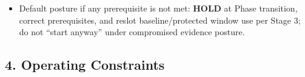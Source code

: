 \documentclass[10pt]{article}
\begin{document}
\begin{itemize}
\begin{itemize}
\item A stable \textbf{RUN} environment exists for \textbf{C9}: either a verified outdoor route identity or a stable treadmill identity with required settings logging.
\item A stable \textbf{STR} proxy environment exists for \textbf{C17} only if \textbf{C17} is finalized and deployable: implement identity, loading method, and setup can be held stable enough to make results comparable.
\end{itemize}
\item Default posture if any prerequisite is not met: \textbf{HOLD} at Phase transition, correct prerequisites, and reslot baseline/protected window use per Stage 3; do not “start anyway” under compromised evidence posture.
\end{itemize}

\subsection*{4. Operating Constraints}
\end{document}
